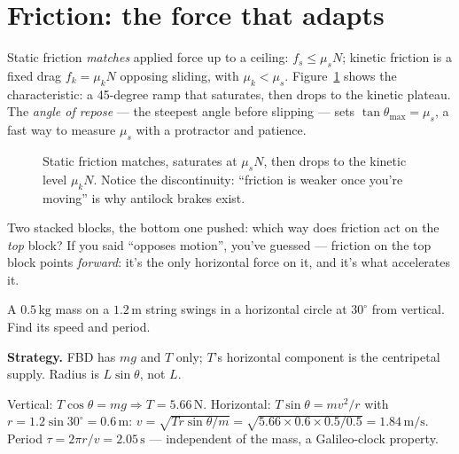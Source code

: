\section{Friction: the force that adapts}\label{sec:new-friction}

Static friction \emph{matches} applied force up to a ceiling:
$f_s\le\mu_sN$; kinetic friction is a fixed drag $f_k=\mu_kN$ opposing
sliding, with $\mu_k<\mu_s$. Figure~\ref{fig:friction} shows the
characteristic: a 45-degree ramp that saturates, then drops to the kinetic
plateau. The \emph{angle of repose} --- the steepest
angle before slipping --- sets $\tan\theta_{\max}=\mu_s$, a fast way to
measure $\mu_s$ with a protractor and patience.

\begin{figure}[htbp]\centering

\caption{Static friction matches, saturates at $\mu_sN$, then drops to the
kinetic level $\mu_kN$. Notice the discontinuity: ``friction is weaker once
you're moving'' is why antilock brakes exist.}
\label{fig:friction}
\end{figure}

\begin{checkpoint}
Two stacked blocks, the bottom one pushed: which way does friction act on
the \emph{top} block? If you said ``opposes motion'', you've guessed ---
friction on the top block points \emph{forward}: it's the only horizontal
force on it, and it's what accelerates it.
\end{checkpoint}

\begin{example}\label{ex:conical}
A $0.5\,\mathrm{kg}$ mass on a $1.2\,\mathrm{m}$ string swings in a
horizontal circle at $30^{\circ}$ from vertical. Find its speed and period.
\par\smallskip
\textbf{Strategy.} FBD has $mg$ and $T$ only; $T$'s horizontal component is
the centripetal supply. Radius is $L\sin\theta$, not $L$.
\begin{solution}
Vertical: $T\cos\theta=mg\Rightarrow T=5.66\,\mathrm{N}$.
Horizontal: $T\sin\theta=mv^{2}/r$ with $r=1.2\sin30^{\circ}=0.6$\,m:
$v=\sqrt{Tr\sin\theta/m}=\sqrt{5.66\times0.6\times0.5/0.5}=1.84\,\mathrm{m/s}$.
Period $\tau=2\pi r/v=2.05\,\mathrm{s}$ --- independent of the mass, a
Galileo-clock property. \checkmark
\end{solution}
\end{example}

